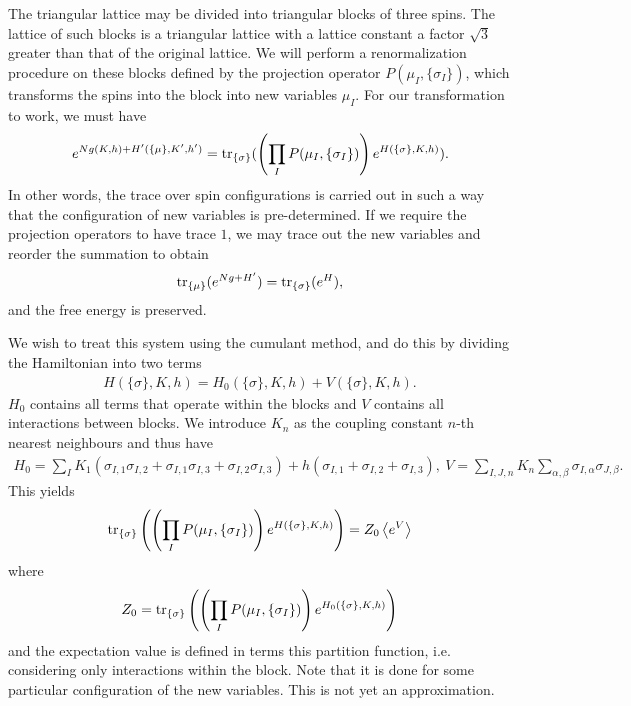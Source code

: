 The triangular lattice may be divided into triangular blocks of three spins. The lattice of such blocks is a triangular lattice with a lattice constant a factor $\sqrt{3}$ greater than that of the original lattice. We will perform a renormalization procedure on these blocks defined by the projection operator $P(\mu_{I}, \{\sigma_{I}\})$, which transforms the spins into the block into new variables $\mu_{I}$. For our transformation to work, we must have
\begin{align*}
	e^{Ng(K, h) + H^{\prime}(\{\mu\}, K^{\prime}, h^{\prime})} = \tr\limits_{\{\sigma\}}(\left(\prod\limits_{I}P(\mu_{I}, \{\sigma_{I}\})\right)e^{H(\{\sigma\}, K , h)}).
\end{align*}
In other words, the trace over spin configurations is carried out in such a way that the configuration of new variables is pre-determined. If we require the projection operators to have trace $1$, we may trace out the new variables and reorder the summation to obtain
\begin{align*}
	\tr\limits_{\{\mu\}}(e^{Ng + H^{\prime}}) = \tr\limits_{\{\sigma\}}(e^{H}),
\end{align*}
and the free energy is preserved.

We wish to treat this system using the cumulant method, and do this by dividing the Hamiltonian into two terms
\begin{align*}
	H(\{\sigma\}, K, h) = H_{0}(\{\sigma\}, K, h) + V(\{\sigma\}, K, h).
\end{align*}
$H_{0}$ contains all terms that operate within the blocks and $V$ contains all interactions between blocks. We introduce $K_{n}$ as the coupling constant $n$-th nearest neighbours and thus have
\begin{align*}
	H_{0} = \sum\limits_{I}K_{1}(\sigma_{I, 1}\sigma_{I, 2} + \sigma_{I, 1}\sigma_{I, 3} + \sigma_{I, 2}\sigma_{I, 3}) + h(\sigma_{I, 1} + \sigma_{I, 2} + \sigma_{I, 3}),\ V = \sum\limits_{I, J, n}K_{n}\sum\limits_{\alpha, \beta}\sigma_{I, \alpha}\sigma_{J, \beta}.
\end{align*}
This yields
\begin{align*}
	\tr\limits_{\{\sigma\}}\left(\left(\prod\limits_{I}P(\mu_{I}, \{\sigma_{I}\})\right)e^{H(\{\sigma\}, K , h)}\right) = Z_{0}\expval{e^{V}}
\end{align*}
where
\begin{align*}
	Z_{0} = \tr\limits_{\{\sigma\}}\left(\left(\prod\limits_{I}P(\mu_{I}, \{\sigma_{I}\})\right)e^{H_{0}(\{\sigma\}, K , h)}\right)
\end{align*}
and the expectation value is defined in terms this partition function, i.e. considering only interactions within the block. Note that it is done for some particular configuration of the new variables. This is not yet an approximation.

